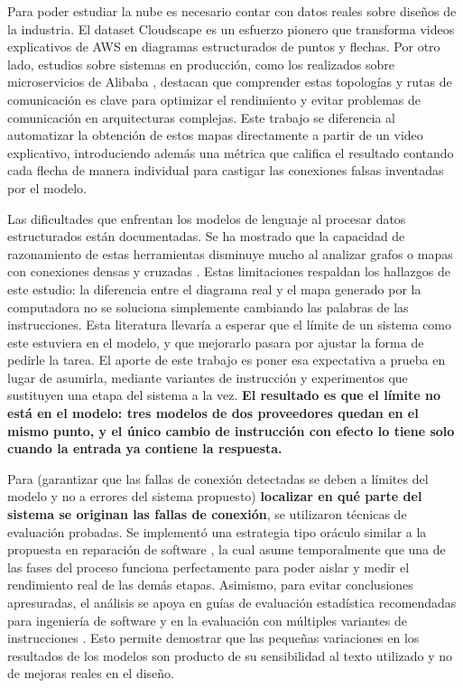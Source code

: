 \documentclass[a4paper, twocolumn, 10pt]{IEEEtran}
\newcommand{\nuevo}[1]{{\bfseries #1}}
\newcommand{\quitado}[1]{(#1)}
\begin{document}
 
Para poder estudiar la nube es necesario contar con datos reales sobre diseños de la industria. El dataset Cloudscape \cite{satija2025cloudscape} es un esfuerzo pionero que transforma videos explicativos de AWS en diagramas estructurados de puntos y flechas. Por otro lado, estudios sobre sistemas en producción, como los realizados sobre microservicios de Alibaba \cite{Luo2021AlibabaMicroservices}, destacan que comprender estas topologías y rutas de comunicación es clave para optimizar el rendimiento y evitar problemas de comunicación en arquitecturas complejas. Este trabajo se diferencia al automatizar la obtención de estos mapas directamente a partir de un video explicativo, introduciendo además una métrica que califica el resultado contando cada flecha de manera individual para castigar las conexiones falsas inventadas por el modelo.
 
Las dificultades que enfrentan los modelos de lenguaje al procesar datos estructurados están documentadas. Se ha mostrado que la capacidad de razonamiento de estas herramientas disminuye mucho al analizar grafos o mapas con conexiones densas y cruzadas \cite{Fatemi2024TalkLikeAGraph, Wang2023NLGraph}. Estas limitaciones respaldan los hallazgos de este estudio: la diferencia entre el diagrama real y el mapa generado por la computadora no se soluciona simplemente cambiando las palabras de las instrucciones. Esta literatura llevaría a esperar que el límite de un sistema como este estuviera en el modelo, y que mejorarlo pasara por ajustar la forma de pedirle la tarea. El aporte de este trabajo es poner esa expectativa a prueba en lugar de asumirla, mediante variantes de instrucción y experimentos que sustituyen
una etapa del sistema a la vez. \nuevo{El resultado es que el límite no está en el modelo: tres
modelos de dos proveedores quedan en el mismo punto, y el único cambio de instrucción
con efecto lo tiene solo cuando la entrada ya contiene la respuesta.}
 
 
Para \quitado{garantizar que las fallas de conexión detectadas se deben a límites del modelo y no a errores del sistema propuesto} \nuevo{localizar en qué parte del sistema se originan las fallas de conexión}, se utilizaron técnicas de evaluación probadas. Se implementó una estrategia tipo oráculo similar a la propuesta en reparación de software \cite{Liu2019FaultLocalizationBias}, la cual asume temporalmente que una de las fases del proceso funciona perfectamente para poder aislar y medir el rendimiento real de las demás etapas. Asimismo, para evitar conclusiones apresuradas, el análisis se apoya en guías de evaluación estadística recomendadas para ingeniería de software \cite{Arcuri2011StatisticalSE} y en la evaluación con múltiples variantes de instrucciones \cite{Mizrahi2024MultiPromptEval}. Esto permite demostrar que las pequeñas variaciones en los resultados de los modelos son producto de su sensibilidad al texto utilizado y no de mejoras reales en el diseño.
\end{document}
